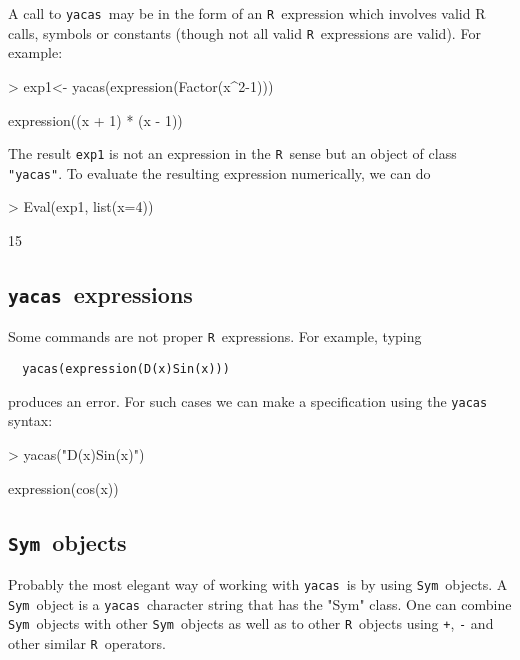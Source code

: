 \documentclass[]{article}
\newcommand{\yacas}{{\tt yacas}}
\newcommand{\code}[1]{{\tt #1}}
\def\R{\texttt{R}}
\def\sym{\texttt{Sym}}
\begin{document}
A call to \yacas\ may be in the form of an \R\ expression which
involves valid R calls, symbols or constants (though not all valid \R\
expressions are valid). For example:
\begin{Schunk}
\begin{Sinput}
> exp1<- yacas(expression(Factor(x^2-1)))
\end{Sinput}
\begin{Soutput}
expression((x + 1) * (x - 1))
\end{Soutput}
\end{Schunk}

The result \code{exp1} is not an expression in the \R\ sense but an
object of class \code{"yacas"}. 
To evaluate the resulting expression numerically, we can do
\begin{Schunk}
\begin{Sinput}
> Eval(exp1, list(x=4))
\end{Sinput}
\begin{Soutput}
[1] 15
\end{Soutput}
\end{Schunk}

\subsection{\yacas\ expressions}

Some commands are not proper \R\ expressions. For example, 
typing 
\begin{verbatim}
  yacas(expression(D(x)Sin(x)))
\end{verbatim}
produces an error. 
For such cases we can make
a specification using the \yacas{} syntax:
\begin{Schunk}
\begin{Sinput}
> yacas("D(x)Sin(x)")
\end{Sinput}
\begin{Soutput}
expression(cos(x))
\end{Soutput}
\end{Schunk}


\subsection{\sym\ objects}

Probably the most elegant way of working with \yacas\ is by using
\sym\ objects.
A \sym\ object is a \yacas\ character string that has the "Sym" class.
One can combine \sym\ objects with other \sym\ objects as well as to
other \R\ objects using \code{+}, \code{-} and other similar \R\
operators.
\end{document}
